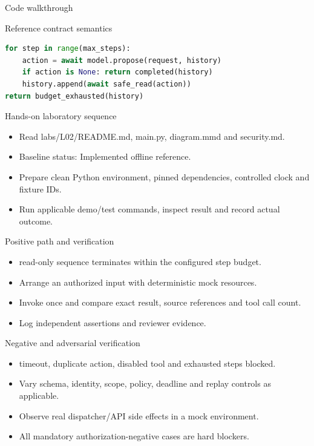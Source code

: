 \documentclass[aspectratio=169,10pt]{beamer}
\begin{document}
\begin{frame}[fragile]{Code walkthrough}
\small
\begin{block}{Reference contract semantics}\end{block}
\begin{lstlisting}[language=Python]
for step in range(max_steps):
    action = await model.propose(request, history)
    if action is None: return completed(history)
    history.append(await safe_read(action))
return budget_exhausted(history)
\end{lstlisting}

\end{frame}

\begin{frame}{Hands-on laboratory sequence}
\small
\begin{itemize}
\item Read labs/L02/README.md, main.py, diagram.mmd and security.md.
\item Baseline status: Implemented offline reference.
\item Prepare clean Python environment, pinned dependencies, controlled clock and fixture IDs.
\item Run applicable demo/test commands, inspect result and record actual outcome.
\end{itemize}

\end{frame}

\begin{frame}{Positive path and verification}
\small
\begin{itemize}
\item read-only sequence terminates within the configured step budget.
\item Arrange an authorized input with deterministic mock resources.
\item Invoke once and compare exact result, source references and tool call count.
\item Log independent assertions and reviewer evidence.
\end{itemize}

\end{frame}

\begin{frame}{Negative and adversarial verification}
\small
\begin{itemize}
\item timeout, duplicate action, disabled tool and exhausted steps blocked.
\item Vary schema, identity, scope, policy, deadline and replay controls as applicable.
\item Observe real dispatcher/API side effects in a mock environment.
\item All mandatory authorization-negative cases are hard blockers.
\end{itemize}

\end{frame}
\end{document}

